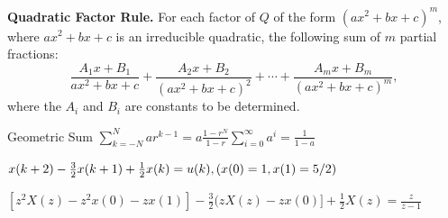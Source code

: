 \begin{multicols}{2}
\medskip
\noindent
{\bf Quadratic Factor Rule.}  
 For each factor of $Q$ of the form $(ax^2+bx+c)^m$, 
 where $ax^2+bx+c$ is an irreducible quadratic, 
 the following sum of $m$ partial fractions:  
\[
\frac{A_1x+B_1}{ax^2+bx+c} + \frac{A_2x+B_2}{(ax^2+bx+c)^2} + \cdots 
  + \frac{A_mx+B_m}{(ax^2+bx+c)^m},
\]
 where the $A_i$ and $B_i$ are constants to be determined. 

Geometric Sum $\sum\limits_{k = -N}^{N} {ar^{k - 1} = a\frac{1-r^{N}}{{1 - r}}} \sum_{i=0}^\infty a^i=\frac{1}{1-a}$

$ x(k+2)-\frac{3}{2}x(k+1)+\frac{1}{2}x(k)=u(k), \text(x(0)=1,x(1)=5/2) $

$[z^2X(z)-z^2x(0)-zx(1)]-\frac{3}{2}(zX(z)-zx(0)]+\frac{1}{2}X(z)=\frac{z}{z-1}$
\end{multicols}


